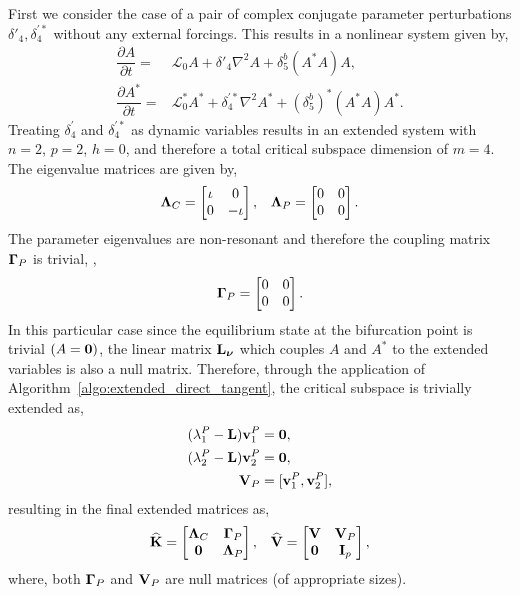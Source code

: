 First we consider the case of a pair of complex conjugate parameter perturbations $\delta'_{4}, \delta^{'*}_{4}$ without any external forcings. This results in a nonlinear system given by,
\begin{subequations}
	\begin{align}
		\dfrac{\partial A}{\partial t} =& \mathcal{L}_{0}A + \delta'_{4}\nabla^{2}A + \delta^{b}_{5} (A^{*}A)A, \nonumber \\
		\dfrac{\partial A^{*}}{\partial t} =& \mathcal{L}^{*}_{0} A^{*} + \delta^{'*}_{4}\nabla^{2}A^{*} + (\delta^{b}_{5})^{*}(A^{*}A)A^{*}. \nonumber
	\end{align}
\end{subequations}
Treating $\delta^{'}_{4}$ and $\delta^{'*}_{4}$ as dynamic variables results in an extended system with $n=2$, $p=2$, $h=0$, and therefore a total critical subspace dimension of $m=4$. The eigenvalue matrices are given by,
\begin{align}
	\mathbf{\Lambda}_{C} = 
	\begin{bmatrix}
		\iota & 0 \\ 
		0 &  -\iota 
	\end{bmatrix}, &&
	\mathbf{\Lambda}_{P} = 
	\begin{bmatrix}
		0 & 0 \\ 
		0 &  0 
	\end{bmatrix}. \nonumber
\end{align}
The parameter eigenvalues are non-resonant and therefore the coupling matrix $\mathbf{\Gamma}_{P}$ is trivial, \ie,
\begin{align}
	\mathbf{\Gamma}_{P} = 
	\begin{bmatrix}
		0 & 0 \\ 
		0 &  0 
	\end{bmatrix}. \nonumber 
\end{align}
In this particular case since the equilibrium state at the bifurcation point is trivial $(A=\mathbf{0})$, the linear matrix $\mathbf{L}_{\boldsymbol{\nu}}$ which couples $A$ and $A^{*}$ to the extended variables is also a null matrix. Therefore, through the application of Algorithm~\ref{algo:extended_direct_tangent}, the critical subspace is trivially extended as,
\begin{align}
	(\lambda^{P}_{1} - \mathbf{L})\mathbf{v}^{P}_{1} &= \mathbf{0}, \nonumber \\
	(\lambda^{P}_{2} - \mathbf{L})\mathbf{v}^{P}_{2} &= \mathbf{0}, \nonumber \\
	\mathbf{V}_{P} &= [\mathbf{v}^{P}_{1}, \mathbf{v}^{P}_{2}], \nonumber 
\end{align}
resulting in the final extended matrices as,
\begin{align}
		\mathbf{\widehat{K}} =
		\begin{bmatrix}
			\mathbf{\Lambda}_{C} & \mathbf{\Gamma}_{P} \\ 
			\mathbf{0} &  \mathbf{\Lambda}_{P} 
		\end{bmatrix}, &&
		\mathbf{\widehat{V}} =
		\begin{bmatrix}
			\mathbf{V} & \mathbf{V}_{P} \\ 
			\mathbf{0} &  \mathbf{I}_{p}
		\end{bmatrix}, \nonumber 
\end{align}
where, both $\mathbf{\Gamma}_{P}$ and $\mathbf{V}_{P}$ are null matrices (of appropriate sizes). 

